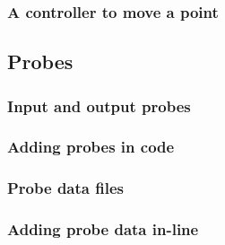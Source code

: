 \subsubsection{A controller to move a point}


\subsection{Probes}

\subsubsection{Input and output probes}

\subsubsection{Adding probes in code}


\subsubsection{Probe data files}

\subsubsection{Adding probe data in-line}

